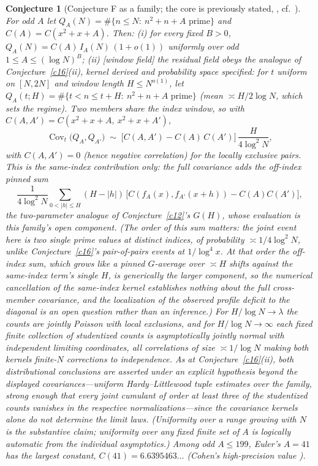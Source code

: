\documentclass[11pt]{article}
\newtheorem{conjecture}{Conjecture}
\theoremstyle{definition}
\begin{document}
\setcounter{conjecture}{15}%
\begin{conjecture}[Conjecture F as a family; the core is previously
stated, \cite{HL1923}, cf.~\cite{JW}]\label{c24}
For odd $A$ let $Q_A(N)=\#\{n\le N:\ n^2+n+A \text{ prime}\}$ and
$C(A)=C(x^2+x+A)$.  Then: \emph{(i)} for every fixed $B>0$, $Q_A(N)=C(A)\,I_A(N)\,(1+o(1))$ uniformly over odd $1\le A\le(\log N)^B$; \emph{(ii)} [window field] the residual field obeys the analogue of Conjecture~\ref{c16}(ii), kernel derived and probability space specified: for $t$ uniform on $[N,2N]$ and window length $H\le
N^{o(1)}$, let
$Q_A(t;H)=\#\{t<n\le t+H:\ n^2+n+A \text{ prime}\}$ (mean
${\asymp}H/2\log N$, which sets the regime).  Two members share the
index window, so with $C(A,A')=C(x^2+x+A,\ x^2+x+A')$,
\[
\operatorname{Cov}_t\bigl(Q_A,Q_{A'}\bigr)\;\sim\;
\bigl[C(A,A')-C(A)\,C(A')\bigr]\,\frac{H}{4\log^2N},
\]
with $C(A,A')=0$ (hence \emph{negative} correlation) for the locally
exclusive pairs.  This is the \emph{same-index} contribution only: the full
covariance adds the off-index pinned sum
\[
\frac1{4\log^2N}\sum_{0<|h|\le H}(H-|h|)\,
\bigl[C(f_A(x),f_{A'}(x+h))-C(A)C(A')\bigr],
\]
the two-parameter analogue of
Conjecture~\ref{c12}'s $G(H)$, whose evaluation is this family's
open component.  (The order of this sum matters: the joint event here is
\emph{two single prime values} at
distinct indices, of probability $\asymp1/4\log^2N$, unlike
Conjecture~\ref{c16}'s pair-of-pairs events at $1/\log^4x$.  At that
order the off-index sum, which grows like a pinned
$G$-average over $\asymp H$ shifts against the same-index term's
single $H$, is generically the \emph{larger} component, so the
numerical cancellation of the same-index kernel establishes nothing
about the full cross-member covariance, and the localization of the
observed profile deficit to the diagonal is an open question rather
than an inference.)  For $H/\log N\to\lambda$ the counts are jointly
Poisson with local exclusions, and for $H/\log N\to\infty$ each
fixed finite collection of studentized counts is asymptotically
jointly normal with independent limiting coordinates, all
correlations of size $\asymp1/\log N$ making
both kernels finite-$N$ corrections to independence.  As at
Conjecture~\ref{c16}(ii), both distributional conclusions are
asserted under an explicit hypothesis beyond the displayed
covariances---uniform Hardy--Littlewood tuple estimates over the
family, strong enough that every joint cumulant of order at least
three of the studentized counts vanishes in the respective
normalizations---since the covariance kernels alone do not
determine the limit laws.
(Uniformity over a range growing with $N$ is the substantive claim;
uniformity over any \emph{fixed} finite set of $A$ is logically
automatic from the individual asymptotics.)  Among
odd $A\le199$, Euler's $A=41$ has the largest constant,
$C(41)=6.6395463\ldots$ (Cohen's high-precision value \cite{Cohen}).
\end{conjecture}
\end{document}
